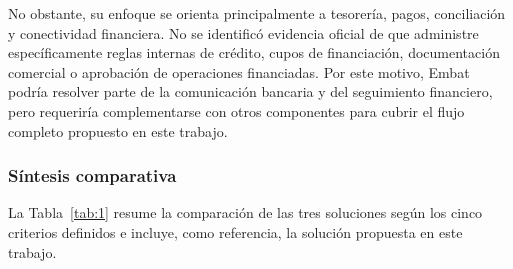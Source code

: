 No obstante, su enfoque se orienta principalmente a tesorería, pagos, conciliación y conectividad financiera. No se identificó evidencia oficial de que administre específicamente reglas internas de crédito, cupos de financiación, documentación comercial o aprobación de operaciones financiadas. Por este motivo, Embat podría resolver parte de la comunicación bancaria y del seguimiento financiero, pero requeriría complementarse con otros componentes para cubrir el flujo completo propuesto en este trabajo.

\subsubsection{Síntesis comparativa}

La Tabla~\ref{tab:1} resume la comparación de las tres soluciones según los cinco criterios definidos e incluye, como referencia, la solución propuesta en este trabajo.

